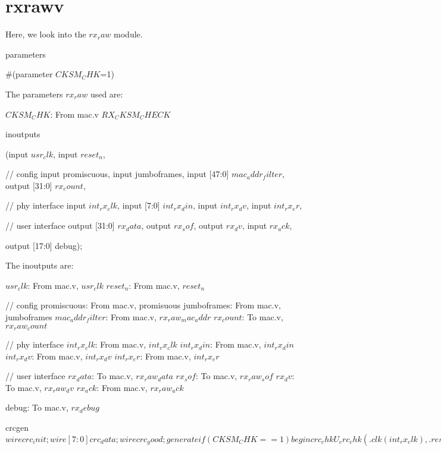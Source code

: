 \chapter{rxrawv}

Here, we look into the $rx_raw$ module.

\begin{chunk}{parameters}

#(parameter $CKSM_CHK$=1)

\end{chunk}

The parameters $rx_raw$ used are:

$CKSM_CHK$: From mac.v $RX_CKSM_CHECK$

\begin{chunk}{inoutputs}

(input $usr_clk$,
 input $reset_n$,

 // config
 input        promiscuous,
 input        jumboframes,
 input [47:0] $mac_addr_filter$,
 output [31:0] $rx_count$,

 // phy interface
 input       $int_rx_clk$,
 input [7:0] $int_rx_din$,
 input       $int_rx_dv$,
 input       $int_rx_er$,

 // user interface
 output [31:0] $rx_data$,
 output        $rx_sof$,
 output        $rx_dv$,
 input         $rx_ack$,

 output [17:0] debug);

\end{chunk}

The inoutputs are:

$usr_clk$: From mac.v, $usr_clk$
$reset_n$: From mac.v, $reset_n$

// config
promiscuous: From mac.v, promisuous
jumboframes: From mac.v, jumboframes
$mac_addr_filter$: From mac.v, $rx_raw_mac_addr$
$rx_count$: To mac.v, $rx_raw_count$

 // phy interface
$int_rx_clk$: From mac.v, $int_rx_clk$
$int_rx_din$: From mac.v, $int_rx_din$
$int_rx_dv$: From mac.v, $int_rx_dv$
$int_rx_er$: From mac.v, $int_rx_er$

 // user interface
$rx_data$: To mac.v, $rx_raw_data$
$rx_sof$: To mac.v, $rx_raw_sof$
$rx_dv$: To mac.v, $rx_raw_dv$
$rx_ack$: From mac.v, $rx_raw_ack$

debug: To mac.v, $rx_debug$

\begin{chunk}{crcgen}
$
wire crc_init;
wire [7:0] crc_data;
wire crc_good;
generate if (CKSM_CHK == 1) begin
   crc_chk U_crc_chk
     (.clk(int_rx_clk), .reset_n(reset_n), 
      .init(crc_init), .data(crc_data), .good(crc_good));
end
else begin
   assign crc_good = 1'b1;
end
endgenerate
$
\end{chunk}

